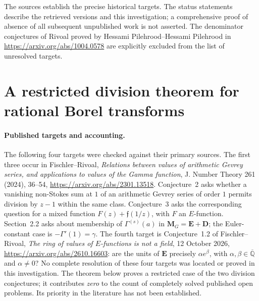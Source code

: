 \documentclass[11pt,a4paper]{article}
\theoremstyle{definition}
\theoremstyle{remark}
\numberwithin{equation}{section}
\begin{document}
The sources establish the precise historical targets.  The status
statements describe the retrieved versions and this investigation;
a comprehensive proof of absence of all subsequent unpublished work
is not asserted.  The denominator conjectures of Rivoal proved by
Hessami Pilehrood--Hessami Pilehrood in
\url{https://arxiv.org/abs/1004.0578} are explicitly excluded from
the list of unresolved targets.

\section{A restricted division theorem for rational Borel transforms}
\label{p8:sf:section}

\paragraph{Published targets and accounting.}
The following four targets were checked against their primary sources.
The first three occur in Fischler--Rivoal,
\emph{Relations between values of arithmetic Gevrey series, and
applications to values of the Gamma function}, J. Number Theory
261 (2024), 36--54,
\url{https://arxiv.org/abs/2301.13518}.
Conjecture~2 asks whether a vanishing non-Stokes sum at $1$ of an
arithmetic Gevrey series of order $1$ permits division by $z-1$
within the same class. Conjecture~3 asks the corresponding question
for a mixed function $F(z)+\mathfrak f(1/z)$, with $F$ an $E$-function.
Section~2.2 asks about membership of $\Gamma^{(s)}(a)$ in
$\mathbf M_G=\mathbf E+\mathbf D$; the Euler-constant case is
$-\Gamma'(1)=\gamma$.
The fourth target is Conjecture~1.2 of Fischler--Rivoal,
\emph{The ring of values of $E$-functions is not a field},
12 October 2026, \url{https://arxiv.org/abs/2610.16603}:
are the units of $\mathbf E$ precisely
$\alpha e^\beta$, with $\alpha,\beta\in\overline{\mathbb Q}$
and $\alpha\ne0$?
No complete resolution of these four targets was located or proved
in this investigation. The theorem below proves a restricted case
of the two division conjectures; it contributes \emph{zero} to the
count of completely solved published open problems. Its priority
in the literature has not been established.
\end{document}
